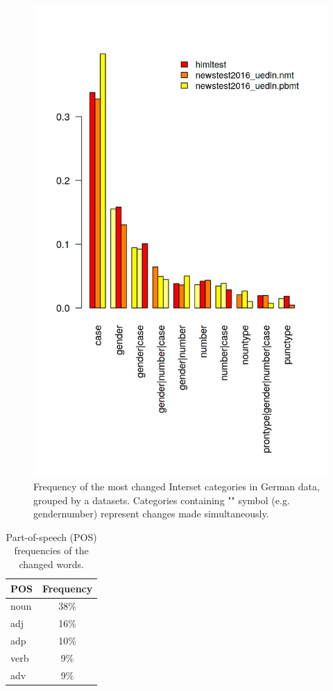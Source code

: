 \begin{figure}
\centering
  \includegraphics[scale=0.7]{iset_de}
  \caption{
    Frequency of the most changed Interset categories in German data, grouped by a datasets. Categories containing
    "\textbar" symbol (e.g. gender\textbar{}number) represent changes made simultaneously.
}
  \label{iset_de-barplot}
\end{figure}

\begin{table}[t]
\centering
\small

\begin{tabular}{lc}
POS  &  Frequency  \\
\hline
noun    &   38\%  \\
adj     &   16\%  \\
adp     &   10\%  \\
verb    &   9\%  \\
adv     &   9\%  \\
\end{tabular}
\caption{
    Part-of-speech (POS) frequencies of the changed words.
}
\label{changes_de-pos}
\end{table}


